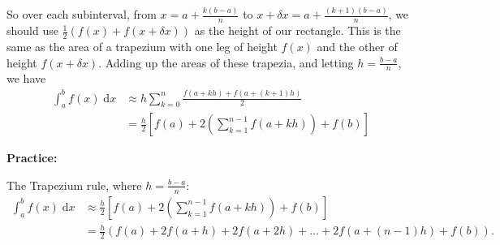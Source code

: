 \documentclass{article}
\newcommand{\diff}{\;\mathrm{d}}
\begin{document}
So over each subinterval, from $x=a+\frac{k(b-a)}{n}$ to $x+\delta x=a+\frac{(k+1)(b-a)}{n}$, we should use $\frac{1}{2}(f(x)+f(x+\delta x))$ as the height of our rectangle. This is the same as the area of a trapezium with one leg of height $f(x)$ and the other of height $f(x+\delta x)$. Adding up the areas of these trapezia, and letting $h=\frac{b-a}{n}$, we have
\begin{align*}
	\int_a^b f(x)\diff x &\approx h\sum_{k=0}^n \frac{f(a+kh)+f(a+(k+1)h)}{2}\\
	&= \frac{h}{2}\left[f(a) + 2\left(\sum_{k=1}^{n-1} f(a+kh)\right) + f(b)\right]
\end{align*}




\clearpage





























\textbf{Practice:}\bigskip

The Trapezium rule, where $h=\frac{b-a}{n}$:
\begin{align*}
	\int_a^b f(x)\diff x &\approx \frac{h}{2}\left[f(a)+2\left(\sum_{k=1}^{n-1}f(a+kh)\right)+f(b)\right]\\
	&=\frac{h}{2}\left(f(a)+2f(a+h) + 2f(a+2h) + \hdots + 2f(a+(n-1)h) + f(b)\right).
\end{align*}
\end{document}
